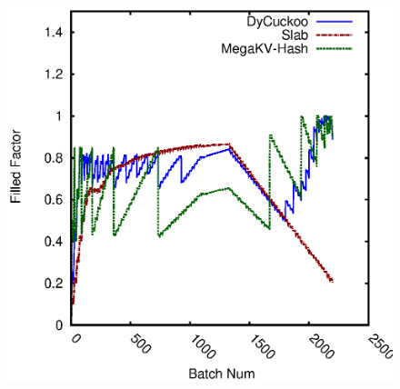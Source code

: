 \begin{figure}[htp]
\begin{minipage}{0.19\linewidth}
		\centerline{\dsali}
	\end{minipage}
	\begin{minipage}{0.19\linewidth}\centering
		\includegraphics[width=\linewidth]{pic/dynamic-load_factor/random/batch_LoadFactor-2.eps}
		\centerline{\dsrandom}
	\end{minipage}
	\caption{}
	\label{fig:track-stability}
\end{figure}
%
